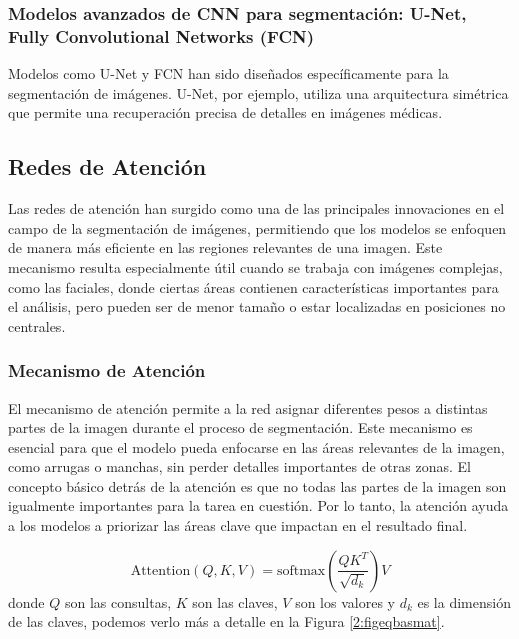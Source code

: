 \subsubsection{Modelos avanzados de CNN para segmentación: U-Net, Fully Convolutional Networks (FCN)}
Modelos como U-Net y FCN han sido diseñados específicamente para la segmentación de imágenes. U-Net, por ejemplo, utiliza una arquitectura simétrica que permite una recuperación precisa de detalles en imágenes médicas. \parencite{ronneberger2015}

\subsection{Redes de Atención}  
Las redes de atención han surgido como una de las principales innovaciones en el campo de la segmentación de imágenes, permitiendo que los modelos se enfoquen de manera más eficiente en las regiones relevantes de una imagen. Este mecanismo resulta especialmente útil cuando se trabaja con imágenes complejas, como las faciales, donde ciertas áreas contienen características importantes para el análisis, pero pueden ser de menor tamaño o estar localizadas en posiciones no centrales.

\subsubsection{Mecanismo de Atención}  
El mecanismo de atención permite a la red asignar diferentes pesos a distintas partes de la imagen durante el proceso de segmentación. Este mecanismo es esencial para que el modelo pueda enfocarse en las áreas relevantes de la imagen, como arrugas o manchas, sin perder detalles importantes de otras zonas. El concepto básico detrás de la atención es que no todas las partes de la imagen son igualmente importantes para la tarea en cuestión. Por lo tanto, la atención ayuda a los modelos a priorizar las áreas clave que impactan en el resultado final.  

\begin{equation}\label{eq:atencion}
    \text{Attention}(Q, K, V) = \text{softmax}\left(\frac{QK^T}{\sqrt{d_k}}\right)V
\end{equation}
donde $Q$ son las consultas, $K$ son las claves, $V$ son los valores y $d_k$ es la dimensión de las claves, podemos verlo más a detalle en la Figura \ref{2:figeqbasmat}.

